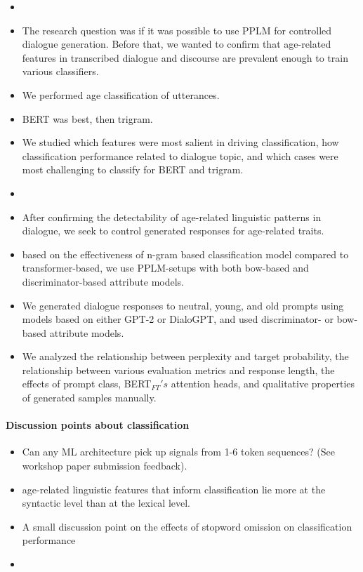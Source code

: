 \begin{itemize}
    \item {}
    \item The research question was if it was possible to use PPLM for controlled dialogue generation. Before that, we wanted to confirm that age-related features in transcribed dialogue and discourse are prevalent enough to train various classifiers.
    \item We performed age classification of utterances.
    \item BERT was best, then trigram. 
    \item We studied which features were most salient in driving classification, how classification performance related to dialogue topic, and which cases were most challenging to classify for BERT and trigram.
    \item {}
    \item After confirming the detectability of age-related linguistic patterns in dialogue, we seek to control generated responses for age-related traits.
    \item based on the effectiveness of n-gram based classification model compared to transformer-based, we use PPLM-setups with both bow-based and discriminator-based attribute models.
    \item We generated dialogue responses to neutral, young, and old prompts using models based on either GPT-2 or DialoGPT, and used discriminator- or bow-based attribute models.
    \item We analyzed the relationship between perplexity and target probability, the relationship between various evaluation metrics and response length, the effects of prompt class, BERT$_{FT}'s$ attention heads, and qualitative properties of generated samples manually.
\end{itemize}

\paragraph{Discussion points about classification}
\begin{itemize}
    \item Can any ML architecture pick up signals from 1-6 token sequences? (See workshop paper submission feedback).
    \item age-related linguistic features that inform classification lie more at the syntactic level than at the lexical level.
    \item A small discussion point on the effects of stopword omission on classification performance
    \item {}
\end{itemize}

